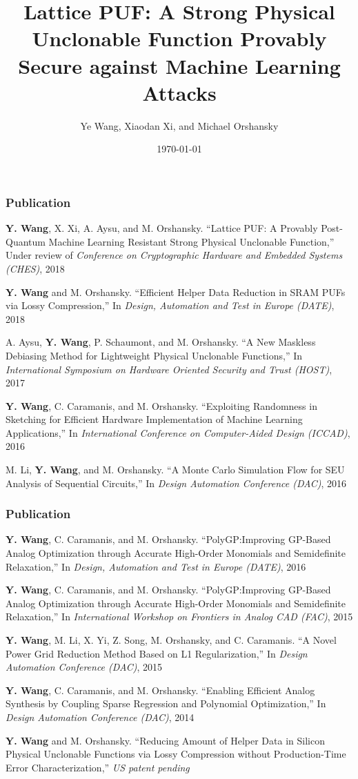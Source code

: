 \documentclass[t]{beamer}
\title[Lattice PUF]{Lattice PUF: A Strong Physical Unclonable Function Provably Secure against Machine Learning Attacks} %
\author[Ye Wang et al.]{Ye Wang, Xiaodan Xi, and Michael Orshansky} %
\institute[UT ECE] %
{
University of Texas at Austin \\ %
\medskip
\textit{lhywang@utexas.edu} %
}
\date{\today} %
\begin{document}


\begin{frame}
\frametitle{Publication}
\begin{itemize}
\footnotesize{
\item	\textbf{Y. Wang}, X. Xi, A. Aysu, and M. Orshansky. ``Lattice PUF: A Provably Post-Quantum Machine Learning Resistant Strong Physical Unclonable Function,'' Under review of \textit{Conference on Cryptographic Hardware and Embedded Systems (CHES)}, 2018
\item	\textbf{Y. Wang} and M. Orshansky. ``Efficient Helper Data Reduction in SRAM PUFs via Lossy Compression,'' In \textit{Design, Automation and Test in Europe (DATE)}, 2018
\item	A. Aysu, \textbf{Y. Wang}, P. Schaumont, and M. Orshansky. ``A New Maskless Debiasing Method for Lightweight Physical Unclonable Functions,'' In \textit{International Symposium on Hardware Oriented Security and Trust (HOST)}, 2017
\item	\textbf{Y. Wang}, C. Caramanis, and M. Orshansky. ``Exploiting Randomness in Sketching for Efficient Hardware Implementation of Machine Learning Applications,'' In \textit{International Conference on Computer-Aided Design (ICCAD)}, 2016
\item	M. Li, \textbf{Y. Wang}, and M. Orshansky. ``A Monte Carlo Simulation Flow for SEU Analysis of Sequential Circuits,'' In \textit{Design Automation Conference (DAC)}, 2016
}
\end{itemize}
\end{frame}

\begin{frame}
\frametitle{Publication}
\begin{itemize}
\footnotesize{
\item	\textbf{Y. Wang}, C. Caramanis, and M. Orshansky. ``PolyGP:Improving GP-Based Analog Optimization through Accurate High-Order Monomials and Semidefinite Relaxation,'' In \textit{Design, Automation and Test in Europe (DATE)}, 2016
\item	\textbf{Y. Wang}, C. Caramanis, and M. Orshansky. ``PolyGP:Improving GP-Based Analog Optimization through Accurate High-Order Monomials and Semidefinite Relaxation,'' In \textit{International Workshop on Frontiers in Analog CAD (FAC)}, 2015
\item	\textbf{Y. Wang}, M. Li, X. Yi, Z. Song, M. Orshansky, and C. Caramanis. ``A Novel Power Grid Reduction Method Based on L1 Regularization,'' In \textit{Design Automation Conference (DAC)}, 2015
\item	\textbf{Y. Wang}, C. Caramanis, and M. Orshansky. ``Enabling Efficient Analog Synthesis by Coupling Sparse Regression and Polynomial Optimization,'' In \textit{Design Automation Conference (DAC)}, 2014
\item	\textbf{Y. Wang} and M. Orshansky. ``Reducing Amount of Helper Data in Silicon Physical Unclonable Functions via Lossy Compression without Production-Time Error Characterization,'' \textit{US patent pending}
}
\end{itemize}
\end{frame}
\end{document}
